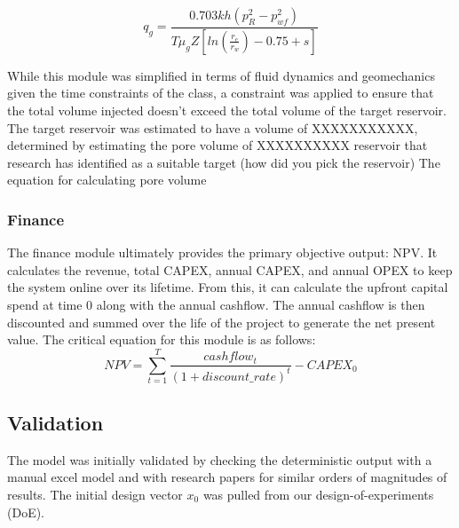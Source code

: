\documentclass[balance,upint,subscriptcorrection,varvw,mathalfa=cal=boondoxo,spanish,french,vietnamese,russian,greek,pdf-a,colorlinks]{asmeconf}
\begin{document}
\begin{equation}
    q_g = \frac{0.703kh(p_{R}^{2}-p_{wf}^{2})}{T\mu_{g}Z[ln(\frac{r_e}{r_w})-0.75+s]}
\end{equation}


While this module was simplified in terms of fluid dynamics and geomechanics given the time constraints of the class, a constraint was applied to ensure that the total volume injected doesn’t exceed the total volume of the target reservoir. The target reservoir was estimated to have a volume of XXXXXXXXXXX, determined by estimating the pore volume of XXXXXXXXXX reservoir that research has identified as a suitable target (how did you pick the reservoir)
The equation for calculating pore volume



\subsubsection{Finance}
The finance module ultimately provides the primary objective output: NPV. It calculates the revenue, total CAPEX, annual CAPEX, and annual OPEX to keep the system online over its lifetime. From this, it can calculate the upfront capital spend at time 0 along with the annual cashflow. The annual cashflow is then discounted and summed over the life of the project to generate the net present value. The critical equation for this module is as follows:
\begin{equation}
    NPV = \sum_{t=1}^{T} \frac{cashflow_t}{(1+discount\_rate)^t} - CAPEX_0
\end{equation}

\subsection{Validation}

The model was initially validated by checking the deterministic output with a manual excel model and with research papers for similar orders of magnitudes of results. The initial design vector \begin{math}{x_0} \end{math} was pulled from our design-of-experiments (DoE).
\end{document}
